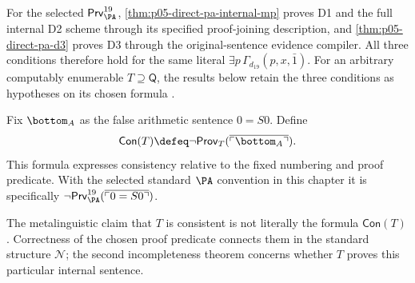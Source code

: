 For the selected \(\mathsf{Prv}^{19}_{\PA}\),
\cref{thm:p05-direct-pa-internal-mp} proves D1 and the full internal D2
scheme through its specified proof-joining description, and
\cref{thm:p05-direct-pa-d3} proves D3 through the original-sentence
evidence compiler. All three conditions therefore hold for the same
literal \(\exists p\,\Gamma_{d_{19}}(p,x,\bar1)\).
For an arbitrary computably enumerable \(T\supseteq\mathsf Q\), the
results below retain the three conditions as hypotheses on its chosen
formula \cite{HilbertBernays1939,Lob1955}.

\begin{definition}
\label{def:formal-consistency-sentence}
Fix \(\bottom_A\) as the false arithmetic sentence \(0=S0\).  Define
\[
  \mathsf{Con}(T)\defeq
  \neg\mathsf{Prov}_T(\overline{\ulcorner\bottom_A\urcorner}).
\]
This formula expresses consistency relative to the fixed numbering and proof
predicate.
With the selected standard \(\PA\) convention in this chapter it is
specifically
\(\neg\mathsf{Prv}^{19}_{\PA}
(\overline{\ulcorner0=S0\urcorner})\).
\end{definition}

\begin{warning}
The metalinguistic claim that \(T\) is consistent is not literally the formula
\(\mathsf{Con}(T)\).  Correctness of the chosen proof predicate connects them
in the standard structure \(\mathcal N\); the second incompleteness
theorem concerns whether
\(T\) proves this particular internal sentence.
\end{warning}
